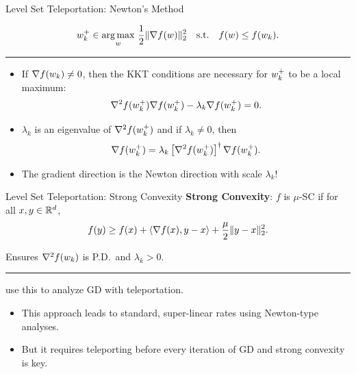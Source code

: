 \documentclass[usenames,dvipsnames,mathserif,notheorems]{beamer}
\newcommand{\horizontalrule}{
	{
			\vspace{-0.5em}
			\center \rule{\textwidth}{0.1em}
			\vspace{-0.2em}
		}
}
\newcommand{\bad}[1]{\textcolor{bad}{#1}}
\newcommand{\good}[1]{\textcolor{good}{#1}}
\begin{document}
\begin{frame}{Level Set Teleportation: Newton's Method}

    \[
        w_k^+ \in \mathop{\rm arg\,max}_w \, \frac 1 2 \|\nabla f(w)\|^2_2  \quad \text{s.t.} \quad f(w) \leq f(w_k).
    \]

    \pause
    \horizontalrule

    \begin{itemize}

        \item If \( \nabla f(w_k) \neq 0 \), then the KKT conditions are
              \good{necessary} for \( w_k^+ \) to be
              a local maximum:
              \[
                  \nabla^2 f(w_k^+) \nabla f(w_k^+) - \lambda_k \nabla f(w_k^+) = 0.
              \]
              \pause
              \vspace{-3ex}

        \item \( \lambda_k \) is an eigenvalue of \( \nabla^2 f(w_k^+) \) and
              if \( \lambda_k \neq 0 \), then
              \[
                  \nabla f(w_k^+) = \lambda_k \left[\nabla^2 f(w_k^+)\right]^{\dagger} \nabla f(w_k^+).
              \]
              \pause

        \item The gradient direction is the Newton direction with scale \( \lambda_k \)!

    \end{itemize}
\end{frame}

\begin{frame}{Level Set Teleportation: Strong Convexity}
    \textbf{Strong Convexity}: \( f \) is \( \mu \)-SC if for all \( x,y \in \mathbb{R}^d \),
    \[
        f(y) \geq f(x) + \left\langle\nabla f(x), y - x\right\rangle + \frac{\mu}{2} \|y - x\|_2^2.
    \]
    \pause
    \vspace{-2ex}

    Ensures \( \nabla^2 f(w_k) \) is P.D.\ and \( \lambda_k > 0 \).
    \pause
    \horizontalrule

    \citet{zhao2023improving} use this to analyze GD with teleportation.
    \pause
    \vspace{1em}
    \begin{itemize}
        \item This approach leads to standard, \good{super-linear} rates using
              Newton-type analyses.

              \pause
              \vspace{1em}
        \item But it requires teleporting before \bad{every iteration} of GD
              and \bad{strong convexity} is key.
    \end{itemize}

\end{frame}
\end{document}
